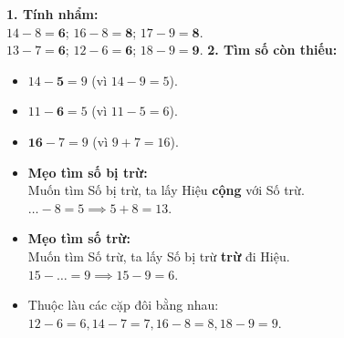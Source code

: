 \documentclass[11pt,a4paper]{article}
\begin{document}
\vspace{-1.5mm}
\noindent
\begin{minipage}[t]{0.49\textwidth}\vspace{0pt}
\begin{tcolorbox}[
  enhanced,
  colback=green!4!white,
  colframe=green!60!black,
  arc=2mm, boxrule=0.8pt,
  left=2mm, right=2mm, top=1.8mm, bottom=1.8mm,
  title={\footnotesize\bfseries\color{white}\faCheckCircle\ 4. Ví dụ thực hành chuẩn mực}
]
{\footnotesize
\textbf{1. Tính nhẩm:}\\
$14 - 8 = \mathbf{6}$; $16 - 8 = \mathbf{8}$; $17 - 9 = \mathbf{8}$.\\
$13 - 7 = \mathbf{6}$; $12 - 6 = \mathbf{6}$; $18 - 9 = \mathbf{9}$.
\textbf{2. Tìm số còn thiếu:}\\
\begin{itemize}\setlength{\itemsep}{0.5pt}\setlength{\leftskip}{-2.5mm}
  \item $14 - \mathbf{5} = 9$ (vì $14 - 9 = 5$).
  \item $11 - \mathbf{6} = 5$ (vì $11 - 5 = 6$).
  \item $\mathbf{16} - 7 = 9$ (vì $9 + 7 = 16$).
\end{itemize}
}
\end{tcolorbox}
\end{minipage}
\hfill
\begin{minipage}[t]{0.49\textwidth}\vspace{0pt}
\begin{tcolorbox}[
  enhanced,
  colback=red!4!white,
  colframe=red!75!black,
  arc=2mm, boxrule=0.8pt,
  left=2mm, right=2mm, top=1.8mm, bottom=1.8mm,
  title={\footnotesize\bfseries\color{white}\faExclamationTriangle\ 5. Mẹo tránh bẫy trắc nghiệm}
]
{\footnotesize
\begin{itemize}\setlength{\itemsep}{1pt}\setlength{\leftskip}{-2.5mm}
  \item \textbf{Mẹo tìm số bị trừ:}\\
  Muốn tìm Số bị trừ, ta lấy Hiệu \textbf{cộng} với Số trừ.\\
  $\dots - 8 = 5 \implies 5 + 8 = 13$.
  \item \textbf{Mẹo tìm số trừ:}\\
  Muốn tìm Số trừ, ta lấy Số bị trừ \textbf{trừ} đi Hiệu.\\
  $15 - \dots = 9 \implies 15 - 9 = 6$.
  \item Thuộc làu các cặp đôi bằng nhau: $12-6=6, 14-7=7, 16-8=8, 18-9=9$.
\end{itemize}
}
\end{tcolorbox}
\end{minipage}
\end{document}
